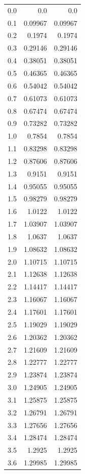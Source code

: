 \documentclass[a4paper, 12pt, margin= 1.25cm ]{article}
\begin{document}
\begin{enumerate}
\begin{center}
\begin{longtable}{c|r|r}
				0.0 & 0.0 & 0.0\\ 
				0.1 & 0.09967 & 0.09967\\ 
				0.2 & 0.1974 & 0.1974\\ 
				0.3 & 0.29146 & 0.29146\\ 
				0.4 & 0.38051 & 0.38051\\ 
				0.5 & 0.46365 & 0.46365\\ 
				0.6 & 0.54042 & 0.54042\\ 
				0.7 & 0.61073 & 0.61073\\ 
				0.8 & 0.67474 & 0.67474\\ 
				0.9 & 0.73282 & 0.73282\\ 
				1.0 & 0.7854 & 0.7854\\ 
				1.1 & 0.83298 & 0.83298\\ 
				1.2 & 0.87606 & 0.87606\\ 
				1.3 & 0.9151 & 0.9151\\ 
				1.4 & 0.95055 & 0.95055\\ 
				1.5 & 0.98279 & 0.98279\\ 
				1.6 & 1.0122 & 1.0122\\ 
				1.7 & 1.03907 & 1.03907\\ 
				1.8 & 1.0637 & 1.0637\\ 
				1.9 & 1.08632 & 1.08632\\ 
				2.0 & 1.10715 & 1.10715\\ 
				2.1 & 1.12638 & 1.12638\\ 
				2.2 & 1.14417 & 1.14417\\ 
				2.3 & 1.16067 & 1.16067\\ 
				2.4 & 1.17601 & 1.17601\\ 
				2.5 & 1.19029 & 1.19029\\ 
				2.6 & 1.20362 & 1.20362\\ 
				2.7 & 1.21609 & 1.21609\\ 
				2.8 & 1.22777 & 1.22777\\ 
				2.9 & 1.23874 & 1.23874\\ 
				3.0 & 1.24905 & 1.24905\\ 
				3.1 & 1.25875 & 1.25875\\ 
				3.2 & 1.26791 & 1.26791\\ 
				3.3 & 1.27656 & 1.27656\\ 
				3.4 & 1.28474 & 1.28474\\ 
				3.5 & 1.2925 & 1.2925\\ 
				3.6 & 1.29985 & 1.29985\\ 

\end{longtable}
\end{center}
\end{enumerate}
\end{document}
